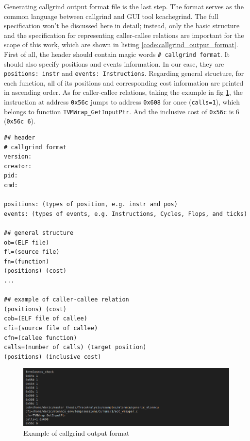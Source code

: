 Generating callgrind output format file is the last step. The format serves as the common language between callgrind and GUI tool kcachegrind. The full specification won't be discussed here in detail; instead, only the basic structure and the specification for representing caller-callee relations are important for the scope of this work, which are shown in listing \ref{code:callgrind_output_format}. First of all, the header should contain magic words \texttt{\# callgrind format}. It should also specify positions and events information. In our case, they are \texttt{positions: instr} and \texttt{events: Instructions}. Regarding general structure, for each function, all of its positions and corresponding cost information are printed in ascending order. As for caller-callee relations, taking the example in fig \ref{fig:callgrind_output_format}, the instruction at address \texttt{0x56c} jumps to address \texttt{0x608} for once (\texttt{calls=1}), which belongs to function \texttt{TVMWrap\_GetInputPtr}. And the inclusive cost of \texttt{0x56c} is 6 (\texttt{0x56c 6}).

\lstset{
  basicstyle=\footnotesize\ttfamily,
  breaklines=true,
  frame=single,
  showstringspaces=false,
  captionpos=b
}

\begin{center}
\begin{minipage}{\textwidth}
\begin{lstlisting}
## header
# callgrind format
version:
creator:
pid:
cmd:

positions: (types of position, e.g. instr and pos)
events: (types of events, e.g. Instructions, Cycles, Flops, and ticks)

## general structure
ob=(ELF file)
fl=(source file)
fn=(function)
(positions) (cost)
...

## example of caller-callee relation
(positions) (cost)
cob=(ELF file of callee)
cfi=(source file of callee)
cfn=(callee function)
calls=(number of calls) (target position)
(positions) (inclusive cost)
\end{lstlisting}
\end{minipage}
\end{center}

\begin{figure}
    \centering
    \includegraphics[width=\linewidth]{figures/Output_format_example.png}
    \caption{Example of callgrind output format}
    \label{fig:callgrind_output_format}
\end{figure}

